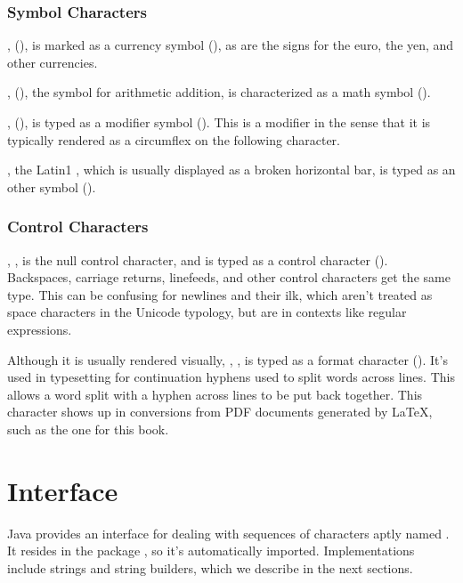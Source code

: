 \subsubsection{Symbol Characters}

,  (\charmention{\$}), is
marked as a currency symbol (), as are the signs for the
euro, the yen, and other currencies.

,  (\charmention{+}), the symbol
for arithmetic addition, is characterized as a math symbol
().

,  (\charmention{\^{}}),
is typed as a modifier symbol ().  This is a modifier in the
sense that it is typically rendered as a circumflex on the following
character.

, the Latin1 , which is usually
displayed as a broken horizontal bar, is typed as an other symbol
().


\subsubsection{Control Characters}

, , is the null control
character, and is typed as a control character ().
Backspaces, carriage returns, linefeeds, and other control characters
get the same type.  This can be confusing for newlines and their ilk,
which aren't treated as space characters in the Unicode typology, but
are in contexts like regular expressions.

Although it is usually rendered visually, ,
, is typed as a format character ().
It's used in typesetting for continuation hyphens used to split words
across lines.  This allows a word split with a hyphen across lines to
be put back together.  This character shows up in conversions from PDF
documents generated by \LaTeX, such as the one for this book.



\section{ Interface}

Java provides an interface for dealing with sequences of characters
aptly named .  It resides in the package
, so it's automatically imported.  Implementations
include strings and string builders, which we describe in the next
sections.

